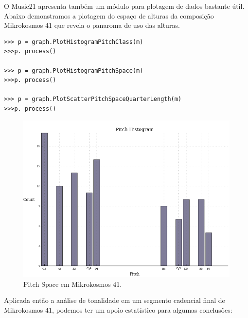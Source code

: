 \documentclass[
	12pt,				%
	openright,			%
	twoside,			%
	a4paper,			%
	english,			%
	french,				%
	spanish,			%
	brazil				%
	]{abntex2}
\begin{document}
O Music21 apresenta também um módulo para plotagem de dados bastante útil. Abaixo demonstramos a plotagem do espaço de alturas da composição Mikrokosmos 41 que revela o panaroma de uso das alturas.


\begin{lstlisting}
>>> p = graph.PlotHistogramPitchClass(m)
>>>p. process()

>>> p = graph.PlotHistogramPitchSpace(m)
>>>p. process()

>>> p = graph.PlotScatterPitchSpaceQuarterLength(m)
>>>p. process()

\end{lstlisting}


\begin{figure}[!h]
	\caption{\label{fig_grafico} Pitch Space em Mikrokosmos 41.} 
	\begin{center}
	    \includegraphics[scale=0.4]{estudosM21/mikro041Pspace.png}
	\end{center}
\end{figure}


Aplicada então a análise de tonalidade em um segmento cadencial final de Mikrokosmos 41, podemos ter um apoio estatístico para algumas conclusões:
\end{document}
